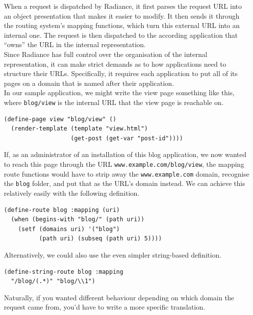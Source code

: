 \documentclass{sig-alternate}
\begin{document}
When a request is dispatched by Radiance, it first parses the request URL into an object presentation that makes it easier to modify. It then sends it through the routing system's mapping functions, which turn this external URL into an internal one. The request is then dispatched to the according application that ``owns'' the URL in the internal representation. \\

Since Radiance has full control over the organisation of the internal representation, it can make strict demands as to how applications need to structure their URLs. Specifically, it requires each application to put all of its pages on a domain that is named after their application. \\

In our sample application, we might write the view page something like this, where \texttt{blog/view} is the internal URL that the view page is reachable on.

\begin{verbatim}
(define-page view "blog/view" ()
  (render-template (template "view.html")
                   (get-post (get-var "post-id"))))
\end{verbatim}

If, as an administrator of an installation of this blog application, we now wanted to reach this page through the URL \texttt{www.example.com/blog/view}, the mapping route functions would have to strip away the \texttt{www.example.com} domain, recognise the \texttt{blog} folder, and put that as the URL's domain instead. We can achieve this relatively easily with the following definition.

\begin{verbatim}
(define-route blog :mapping (uri)
  (when (begins-with "blog/" (path uri))
    (setf (domains uri) '("blog")
          (path uri) (subseq (path uri) 5))))
\end{verbatim}

Alternatively, we could also use the even simpler string-based definition.

\begin{verbatim}
(define-string-route blog :mapping
  "/blog/(.*)" "blog/\\1")
\end{verbatim}

Naturally, if you wanted different behaviour depending on which domain the request came from, you'd have to write a more specific translation. \\
\end{document}
